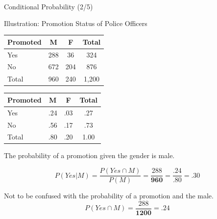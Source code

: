 \documentclass{beamer}
\begin{document}
\begin{frame}{Conditional Probability (2/5)}

\begin{center}
Illustration: Promotion Status of Police Officers
\end{center}

\begin{multicols}{2}

\begin{small}
\begin{center}
\begin{tabular}{l|c|c|c}
\hline 
Promoted & M & F & Total \\ 
\hline 
Yes & 288 & 36 & 324 \\ 
\hline 
No & 672 & 204 & 876 \\ 
\hline 
Total & 960 & 240 & 1,200 \\ 
\hline 
\end{tabular}
\end{center}

\begin{center}
\begin{tabular}{l|c|c|c}
\hline 
Promoted & M & F & Total \\ 
\hline 
Yes & .24 & .03 & .27 \\ 
\hline 
No & .56 & .17 & .73 \\ 
\hline 
Total & .80 & .20 & 1.00 \\ 
\hline 
\end{tabular}
\end{center}
\end{small}
\end{multicols}

The probability of a promotion given the gender is male.

$$P(Yes|M) = \frac{P(Yes \cap M)}{P(M)} = \frac{288}{\textbf{960}} = \frac{.24}{.80} = .30$$

Not to be confused with the probability of a promotion and the male.
$$ P(Yes \cap M) = \frac{288}{\textbf{1200}} = .24 $$

\end{frame}
\end{document}
